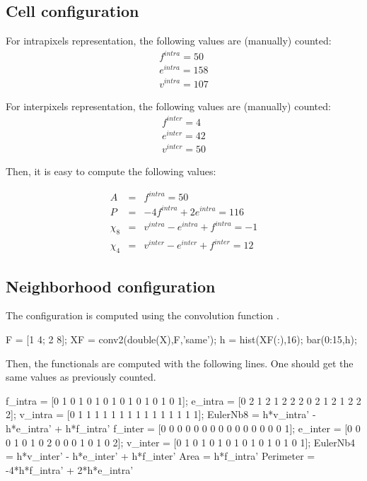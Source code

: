 \def\QRCODE{TB_IPR_TUT.IMG.integral_geometry_matlabqrcode.png}
\def\QRPAGE{http://www.iptutorials.science/tree/master/TB_IPR/TUT.IMG.integral_geometry/matlab}

\subsection{Cell configuration}

For intrapixels representation, the following values are (manually) counted: 
\begin{eqnarray*}
 f^{intra}=50 \\
 e^{intra}=158 \\
 v^{intra}=107
\end{eqnarray*}

For interpixels representation, the following values are (manually) counted: 
\begin{eqnarray*}
 f^{inter}=4 \\
 e^{inter}=42 \\
 v^{inter}=50
\end{eqnarray*}

Then, it is easy to compute the following values:

\begin{eqnarray*}
A&=&f^{intra}=50\\
P&=&-4f^{intra}+2e^{intra}=116\\
\chi_8&=&v^{intra}-e^{intra}+f^{intra}=-1\\
\chi_4&=&v^{inter}-e^{inter}+f^{inter}=12
\end{eqnarray*}

\subsection{Neighborhood configuration}
The configuration is computed using the convolution function .
\begin{matlab}
F = [1 4; 2 8];
XF = conv2(double(X),F,'same');
h = hist(XF(:),16);
bar(0:15,h);
\end{matlab}

Then, the functionals are computed with the following lines. One should get the same values as previously counted.
\begin{matlab}
f_intra = [0 1 0 1 0 1 0 1 0 1 0 1 0 1 0 1];
e_intra = [0 2 1 2 1 2 2 2 0 2 1 2 1 2 2 2];
v_intra = [0 1 1 1 1 1 1 1 1 1 1 1 1 1 1 1];
EulerNb8 = h*v_intra' - h*e_intra' + h*f_intra'
f_inter = [0 0 0 0 0 0 0 0 0 0 0 0 0 0 0 1];
e_inter = [0 0 0 1 0 1 0 2 0 0 0 1 0 1 0 2];
v_inter = [0 1 0 1 0 1 0 1 0 1 0 1 0 1 0 1];
EulerNb4 = h*v_inter' - h*e_inter' + h*f_inter'
Area = h*f_intra'
Perimeter = -4*h*f_intra' + 2*h*e_intra'
\end{matlab}

